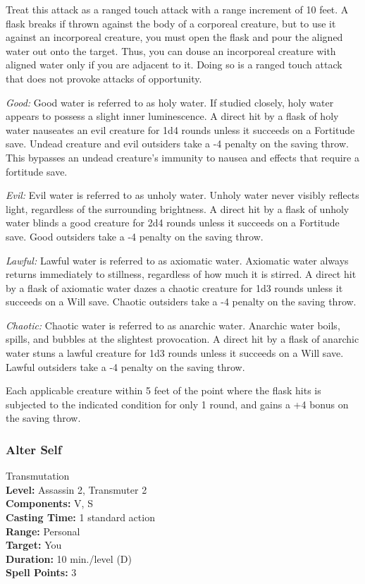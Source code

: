 Treat this attack as a ranged touch attack with a range increment of 10 feet. 
A flask breaks if thrown against the body of a corporeal creature, but to use it against an incorporeal creature, you must open the flask and pour the aligned water out onto the target. 
Thus, you can douse an incorporeal creature with aligned water only if you are adjacent to it. 
Doing so is a ranged touch attack that does not provoke attacks of opportunity.
\begin{list}{}{\leftmargin=1em}
 \item \emph{Good:} Good water is referred to as holy water. 
 If studied closely, holy water appears to possess a slight inner luminescence.
 A direct hit by a flask of holy water nauseates an evil creature for 1d4 rounds unless it succeeds on a Fortitude save. 
 Undead creature and evil outsiders take a -4 penalty on the saving throw.
 This bypasses an undead creature's immunity to nausea and effects that require a fortitude save.
 \item \emph{Evil:} Evil water is referred to as unholy water. 
 Unholy water never visibly reflects light, regardless of the surrounding brightness.
 A direct hit by a flask of unholy water blinds a good creature for 2d4 rounds unless it succeeds on a Fortitude save. 
 Good outsiders take a -4 penalty on the saving throw.
 \item \emph{Lawful:} Lawful water is referred to as axiomatic water. 
 Axiomatic water always returns immediately to stillness, regardless of how much it is stirred.
 A direct hit by a flask of axiomatic water dazes a chaotic creature for 1d3 rounds unless it succeeds on a Will save. 
 Chaotic outsiders take a -4 penalty on the saving throw.
 \item \emph{Chaotic:} Chaotic water is referred to as anarchic water. 
 Anarchic water boils, spills, and bubbles at the slightest provocation.
 A direct hit by a flask of anarchic water stuns a lawful creature for 1d3 rounds unless it succeeds on a Will save. 
 Lawful outsiders take a -4 penalty on the saving throw.
\end{list} 
Each applicable creature within 5 feet of the point where the flask hits is subjected to the indicated condition for only 1 round, and gains a +4 bonus on the saving throw.
\subsubsection{Alter Self}
\label{Spell:AlterSelf}
Transmutation
\\ \textbf{Level:} Assassin 2, Transmuter 2
\\ \textbf{Components:} V, S
\\ \textbf{Casting Time:} 1 standard action
\\ \textbf{Range:} Personal
\\ \textbf{Target:} You
\\ \textbf{Duration:} 10 min./level (D)
\\ \textbf{Spell Points:} 3

